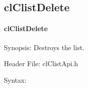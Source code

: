 \begin{flushleft}
\subsection{clClistDelete}
\hypertarget{pagecl114}{}\paragraph{cl\-Clist\-Delete}\label{pagecl114}
\begin{Desc}
\item[Synopsis:]Destroys the list.\end{Desc}
\begin{Desc}
\item[Header File:]clClistApi.h\end{Desc}
\begin{Desc}
\item[Syntax:]


\end{Desc}
\end{flushleft}
